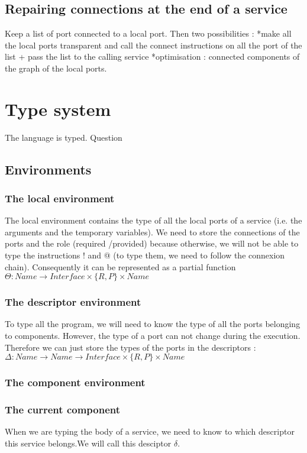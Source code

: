 \section{Repairing connections at the end of a service}
Keep a list of port connected to a local port. Then two possibilities : 
*make all the local ports transparent and call the connect instructions on all the port of the list + pass the list to the calling service
*optimisation : connected components of the graph of the local ports.




\chapter{Type system}
The \compo{} language is typed.
Question 
\section{Environments}
\subsection{The local environment}
The local environment contains the type of all the local ports of a service (i.e. the arguments and the temporary variables). We need to store the connections of the ports and the role (required /provided) because otherwise, we will not be able to type the instructions ! and @ (to type them, we need to follow the connexion chain).  Consequently it can be represented as a partial function $\Theta : Name \rightarrow Interface \times \{R,P\} \times Name$

\subsection{The descriptor environment}
To type all the program, we will need to know the type of all the ports belonging to components. However, the type of a port can not change during the execution. Therefore we can just store the types of the ports in the descriptors : $\Delta:Name \rightarrow Name\rightarrow Interface \times \{R,P\} \times Name$


\subsection{The component environment}
\subsection{The current component}
When we are typing the body of a service, we need to know to which descriptor this service belongs.We will call this desciptor $\delta$.

